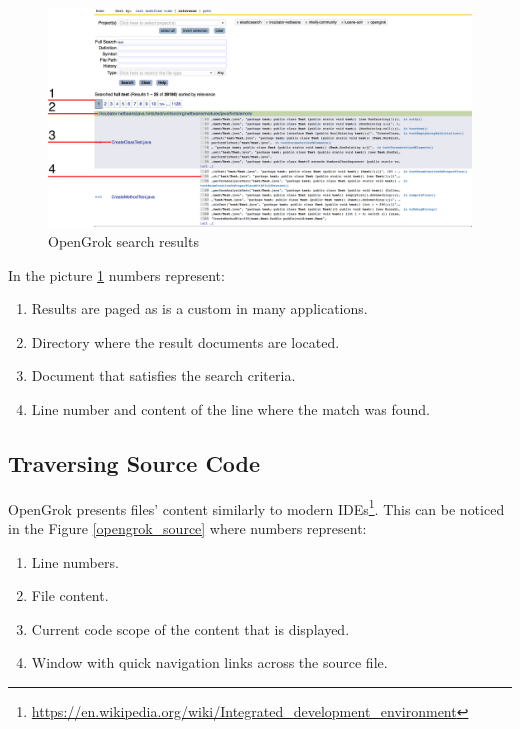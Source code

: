 \begin{figure}[htbp]
    \centering
    \includegraphics[width=145mm]{../img/opengrok_results.png}
    \caption{OpenGrok search results}
    \label{opengrok_results}
\end{figure}

In the picture \ref{opengrok_results} numbers represent:
\begin{enumerate}
    \item Results are paged as is a custom in many applications.
    \item Directory where the result documents are located.
    \item Document that satisfies the search criteria.
    \item Line number and content of the line where the match was found.
\end{enumerate}

\subsection{Traversing Source Code}

OpenGrok presents files' content similarly to modern
IDEs\footnote{\url{https://en.wikipedia.org/wiki/Integrated_development_environment}}. This can be noticed in the Figure
\ref{opengrok_source} where numbers represent:

\begin{enumerate}
    \item Line numbers.
    \item File content.
    \item Current code scope of the content that is displayed.
    \item Window with quick navigation links across the source file.
\end{enumerate}

